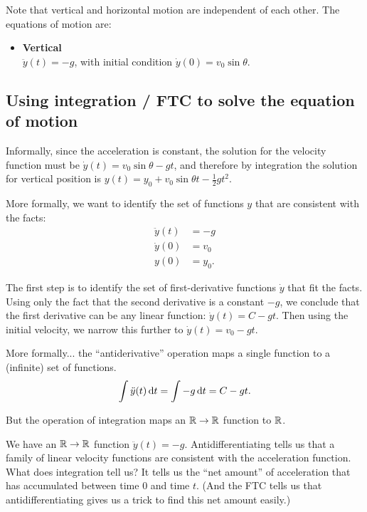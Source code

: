 Note that vertical and horizontal motion are independent of each other. The equations of motion are:

\begin{itemize}
\item {\bf Vertical}\\
  $\ddot{y}(t) = -g$, with initial condition $\dot{y}(0) = v_0\sin\theta$.
\end{itemize}

\subsection{Using integration / FTC to solve the equation of motion}
Informally, since the acceleration is constant, the solution for the velocity function must be
$\dot{y}(t) = v_0\sin\theta - gt$, and therefore by integration the solution for vertical
position is $y(t) = y_0 + v_0\sin\theta t -\frac{1}{2}gt^2$.

More formally, we want to identify the set of functions $y$ that are consistent with the facts:
\begin{align*}
  \ddot{y}(t) &= -g \\
  \dot{y}(0)  &= v_0 \\
  y(0)        &= y_0.
\end{align*}

The first step is to identify the set of first-derivative functions $\dot{y}$ that fit the
facts. Using only the fact that the second derivative is a constant $-g$, we conclude that the
first derivative can be any linear function: $\dot{y}(t) = C - gt$. Then using the initial
velocity, we narrow this further to $\dot{y}(t) = v_0 - gt$.

More formally... the ``antiderivative'' operation maps a single function to a (infinite) set of
functions.
\begin{align*}
  \int \ddot{y}(t) \dt = \int -g \dt = C - gt.
\end{align*}

But the operation of integration maps an $\mathbb{R} \to \mathbb{R}$ function to $\mathbb{R}$.

We have an $\mathbb{R} \to \mathbb{R}$ function $\ddot{y}(t) = -g$. Antidifferentiating tells us that a family of
linear velocity functions are consistent with the acceleration function. What does integration
tell us? It tells us the ``net amount'' of acceleration that has accumulated between time $0$ and
time $t$. (And the FTC tells us that antidifferentiating gives us a trick to find this net amount
easily.)


